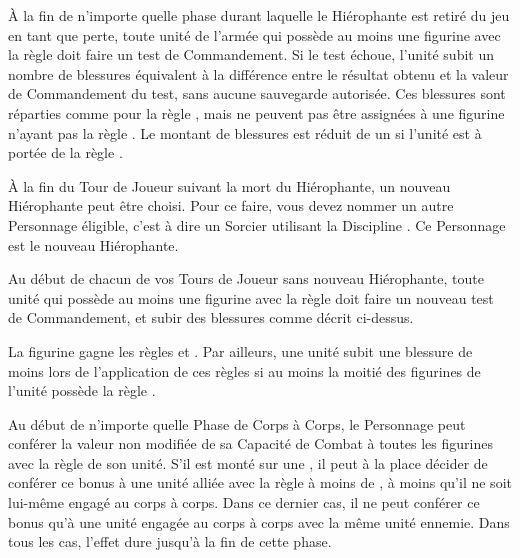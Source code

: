 \vspace*{1.5cm}
\startarmyspecialrules

\armyspecialruleentry{\dusttodust}

À la fin de n'importe quelle phase durant laquelle le Hiérophante est retiré du jeu en tant que perte, toute unité de l'armée qui possède au moins une figurine avec la règle \dusttodust{} doit faire un test de Commandement. Si le test échoue, l'unité subit un nombre de blessures équivalent à la différence entre le résultat obtenu et la valeur de Commandement du test, sans aucune sauvegarde autorisée. Ces blessures sont réparties comme pour la règle \unstable{}, mais ne peuvent pas être assignées à une figurine n'ayant pas la règle \dusttodust{}. Le montant de blessures est réduit de un si l'unité est à portée de la règle \holdyourground{}.

À la fin du Tour de Joueur suivant la mort du Hiérophante, un nouveau Hiérophante peut être choisi. Pour ce faire, vous devez nommer un autre Personnage éligible, c'est à dire un Sorcier utilisant la Discipline \sands{}. Ce Personnage est le nouveau Hiérophante.

Au début de chacun de vos Tours de Joueur sans nouveau Hiérophante, toute unité qui possède au moins une figurine avec la règle \dusttodust{} doit faire un nouveau test de Commandement, et subir des blessures comme décrit ci-dessus.

\armyspecialruleentry{\undeadconstruct}

La figurine gagne les règles \dusttodust{} et \undead{}. Par ailleurs, une unité subit une blessure de moins lors de l'application de ces règles si au moins la moitié des figurines de l'unité possède la règle \undeadconstruct{}.

\armyspecialruleentry{\undyingwill}

Au début de n'importe quelle Phase de Corps à Corps, le Personnage peut conférer la valeur non modifiée de sa Capacité de Combat à toutes les figurines avec la règle \undead{} de son unité. S'il est monté sur une \largetarget{}, il peut à la place décider de conférer ce bonus à une unité alliée avec la règle \undead{} à moins de , à moins qu'il ne soit lui-même engagé au corps à corps. Dans ce dernier cas, il ne peut conférer ce bonus qu'à une unité \undead{} engagée au corps à corps avec la même unité ennemie. Dans tous les cas, l'effet dure jusqu'à la fin de cette phase.

\armyspecialruleentry{\necromanticaura}

